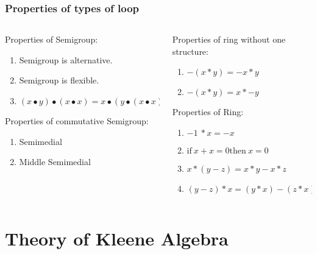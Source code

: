 \documentclass[xcolor={dvipsnames}]{beamer}
\begin{document}
  \begin{frame}[fragile]
    \frametitle{Properties of types of loop}  
    \begin{columns}
      \begin{column}{0.4\textwidth}
        Properties of Semigroup:
        \begin{enumerate}
            \item Semigroup is alternative.
            \item Semigroup is flexible. 
            \item  \((x ∙ y) ∙ (x ∙ x) = x ∙ (y ∙ (x ∙ x)). \)
            \end{enumerate}
        Properties of commutative Semigroup:
        \begin{enumerate}
            \item Semimedial
            \item Middle Semimedial
        \end{enumerate}
      \end{column}
      \hfill
      \begin{column}{0.575\textwidth}
        Properties of ring without one structure:
        \begin{enumerate}
        \item \(- (x * y) = - x * y\)
        \item \(- (x * y) = x * - y\)
        \end{enumerate}
        Properties of Ring:
        \begin{enumerate}
            \item \(- 1\ * x = -x\)
            \item \(\text{if}\ x + x =0 \text{then}\ x=0\)
            \item \(x*(y-z)=x*y-x*z\)
            \item \((y-z)*x=(y*x)-(z*x)\)
        \end{enumerate}
      \end{column}
    \end{columns}
  \end{frame}

\section{Theory of Kleene Algebra}
\end{document}
